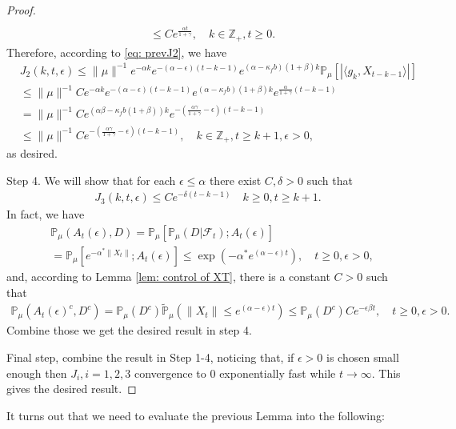 \documentclass[12pt,oneside,english]{amsart}
\theoremstyle{plain}
\theoremstyle{definition}
\numberwithin{equation}{section}
\begin{document}
\begin{proof}
\begin{align}
    \\&\leq C e^{\frac{\alpha t}{1+\gamma}},\quad k \in \mathbb Z_+, t\geq 0.
\end{align}
Therefore, according to \eqref{eq: prevJ2}, we have
\begin{align}
	&J_2(k,t,\epsilon)
	\leq  \|\mu\|^{-1}e^{-\alpha k}e^{-(\alpha-\epsilon)(t-k-1)}e^{(\alpha-\kappa_f b)(1+\beta)k} \mathbb{P}_{\mu}\left[\left|\langle g_k,X_{t-k-1}\rangle\right|\right]
	\\&\leq \|\mu\|^{-1}C e^{-\alpha k}e^{-(\alpha-\epsilon)(t-k-1)}e^{(\alpha-\kappa_f b)(1+\beta)k} e^{\frac{\alpha}{1+\gamma}(t-k-1)}
	\\&= \|\mu\|^{-1}C e^{(\alpha \beta - \kappa_f b(1+\beta))k}e^{-(\frac{\alpha\gamma}{1+\gamma}-\epsilon)(t-k-1)}
	\\&\leq \|\mu\|^{-1}C e^{-(\frac{\alpha\gamma}{1+\gamma}-\epsilon)(t-k-1)}, \quad k \in \mathbb Z_+, t\geq k+1, \epsilon > 0,
\end{align}
	as desired.

	Step 4. We will show that for each $\epsilon\leq \alpha$ there exist $C,\delta>0$ such that
\begin{align}\label{ineq: control of J3}
    J_3(k,t,\epsilon)\leq Ce^{-\delta (t-k-1)}\quad k\geq0, t\geq k+1.
\end{align}
	In fact, we have
\begin{align}
	&\mathbb P_{\mu}(A_{t}(\epsilon), D) = \mathbb P_{\mu}[\mathbb P_{\mu}(D|\mathscr F_t);A_t(\epsilon)]
	\\&= \mathbb P_\mu[e^{-\alpha^*\|X_t\|};A_t(\epsilon)]
	\leq \exp({-\alpha^* e^{(\alpha - \epsilon)t}}),\quad t\geq 0, \epsilon >0,
\end{align}
	and, according to Lemma \ref{lem: control of XT}, there is a constant $C>0$ such that
\begin{align}
	\mathbb P_\mu(A_t(\epsilon)^c,D^c) = \mathbb P_\mu(D^c) \tilde{\mathbb P}_\mu(\|X_t\|\leq e^{(\alpha - \epsilon) t}) \leq \mathbb P_\mu(D^c)C e^{-\epsilon \beta t},\quad t\geq 0, \epsilon >0.
\end{align}
	Combine those we get the desired result in step 4.

	Final step, combine the result in Step 1-4, noticing that, if $\epsilon>0$ is chosen small enough then $J_{i}, i = 1,2,3$ convergence to $0$ exponentially fast while $t\rightarrow\infty$.
	This gives the desired result.
\end{proof}

	It turns out that we need to evaluate the previous Lemma into the following:
\end{document}
